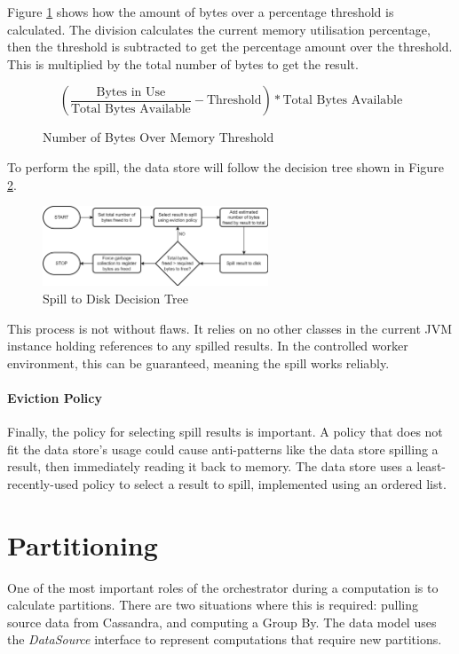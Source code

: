 Figure \ref{fig:bytes-over-memory-threshold} shows how the amount of bytes over a percentage threshold is calculated. The division calculates the current memory utilisation percentage, then the threshold is subtracted to get the percentage amount over the threshold. This is multiplied by the total number of bytes to get the result.

\begin{figure}[h]
	\centering
	\[ \left( \frac{\text{Bytes in Use}}{\text{Total Bytes Available}} - \text{Threshold} \right) * \text{Total Bytes Available} \]
	\caption{Number of Bytes Over Memory Threshold}
	\label{fig:bytes-over-memory-threshold}
\end{figure}

To perform the spill, the data store will follow the decision tree shown in Figure \ref{fig:spill-to-disk-process}.

\begin{figure}[h]
	\centering
	\includegraphics[width=0.6\textwidth]{chapters/diagrams/implementation/spill-to-disk-process}
	\caption{Spill to Disk Decision Tree}
	\label{fig:spill-to-disk-process}
\end{figure}

This process is not without flaws. It relies on no other classes in the current JVM instance holding references to any spilled results. In the controlled worker environment, this can be guaranteed, meaning the spill works reliably. 

\paragraph{Eviction Policy}
Finally, the policy for selecting spill results is important. A policy that does not fit the data store's usage could cause anti-patterns like the data store spilling a result, then immediately reading it back to memory. The data store uses a least-recently-used policy to select a result to spill, implemented using an ordered list.



\section{Partitioning}
One of the most important roles of the orchestrator during a computation is to calculate partitions. There are two situations where this is required:  pulling source data from Cassandra, and computing a Group By. The data model uses the \textit{DataSource} interface to represent computations that require new partitions. 

